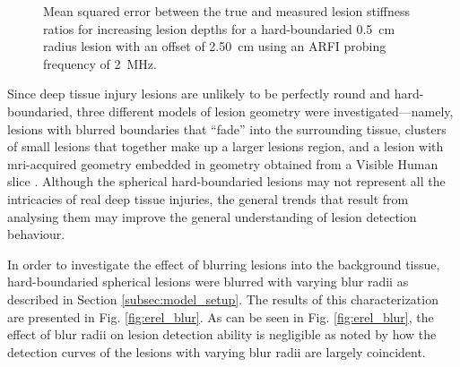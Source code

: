 			\begin{figure}[!htb]
				\centering
				\caption[Shear-wave speed quantified mean squared error related to lesion depth]{Mean squared error between the true and measured lesion stiffness ratios for increasing lesion depths for a hard-boundaried \SI{0.5}{cm} radius lesion with an offset of \SI{2.50}{\cm} using an ARFI probing frequency of \SI{2}{\MHz}.}
				\label{fig:erel_depth_mse_o250}
			\end{figure}

			Since deep tissue injury lesions are unlikely to be perfectly round and hard-boundaried, three different models of lesion geometry were investigated---namely, lesions with blurred boundaries that ``fade'' into the surrounding tissue, clusters of small lesions that together make up a larger lesions region, and a lesion with mri-acquired geometry \cite{solis13} embedded in geometry obtained from a Visible Human slice \cite{visiblehuman}. Although the spherical hard-boundaried lesions may not represent all the intricacies of real deep tissue injuries, the general trends that result from analysing them may improve the general understanding of lesion detection behaviour.

			In order to investigate the effect of blurring lesions into the background tissue, hard-boundaried spherical lesions were blurred with varying blur radii as described in Section \ref{subsec:model_setup}. The results of this characterization are presented in Fig. \ref{fig:erel_blur}. As can be seen in Fig. \ref{fig:erel_blur}, the effect of blur radii on lesion detection ability is negligible as noted by how the detection curves of the lesions with varying blur radii are largely coincident.

